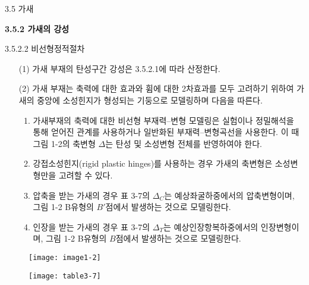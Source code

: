	\begin{frame}{3.5 가새}

	\textbf{3.5.2 가새의 강성}
	
	3.5.2.2 비선형정적절차
	
	\begin{enumerate}
		\item[(1)] 가새 부재의 탄성구간 강성은 3.5.2.1에 따라 산정한다. 
		\item[(2)] 가새 부재는 축력에 대한 효과와 휨에 대한 2차효과를 모두 고려하기 위하여 가새의 중앙에 소성힌지가 형성되는 기둥으로 모델링하며 다음을 따른다.  
		\begin{enumerate}[label=\large\protect\textcircled{\small\arabic*}]
			\item 가새부재의 축력에 대한 비선형 부재력--변형 모델링은 실험이나 정밀해석을 통해 얻어진 관계를 사용하거나 일반화된 부재력--변형곡선을 사용한다. 이 때 그림 1-2의 축변형 $\Delta$는 탄성 및 소성변형 전체를 반영하여야 한다.  
			\item 강접소성힌지(rigid plastic hinges)를 사용하는 경우 가새의 축변형은 소성변형만을 고려할 수 있다. 
			\item 압축을 받는 가새의 경우 표 3-7의 $\Delta_C$는 예상좌굴하중에서의 압축변형이며, 그림 1-2 B유형의 $B'$점에서 발생하는 것으로 모델링한다. 
			\item 인장을 받는 가새의 경우 표 3-7의 $\Delta_T$는 예상인장항복하중에서의 인장변형이며, 그림 1-2 B유형의 $B$점에서 발생하는 것으로 모델링한다. 
		\end{enumerate}
	\end{enumerate}
	\end{frame}
	

	\begin{frame}

		\begin{figure}
			\centering
			\texttt{[image: image1-2]}
		\end{figure}

	\end{frame}


	\begin{frame}
		\begin{figure}
			\centering
			\texttt{[image: table3-7]}
		\end{figure}
	\end{frame}



